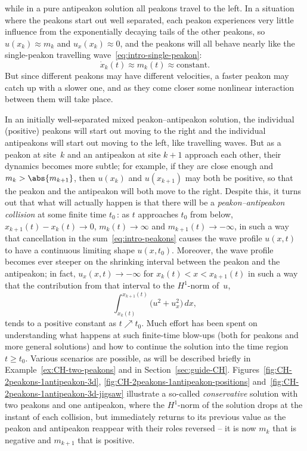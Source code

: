 \documentclass[10pt,a4paper]{article} \pdfoutput=1 
\begin{document}
while in a pure antipeakon solution all peakons travel to the left.
In a situation where the peakons start out well separated,
each peakon experiences very little influence
from the exponentially decaying tails of the other peakons,
so $u(x_k) \approx m_k$ and $u_x(x_k) \approx 0$,
and the peakons will all behave nearly like the single-peakon travelling wave~\eqref{eq:intro-single-peakon}:
\begin{equation*}
  \dot x_k(t) \approx m_k(t) \approx \text{constant}
  .
\end{equation*}
But since different peakons may have different velocities,
a faster peakon may catch up with a slower one,
and as they come closer some nonlinear interaction between them will take place.

In an initially well-separated mixed peakon--antipeakon solution,
the individual (positive) peakons will start out moving to the right
and the individual antipeakons will start out moving to the left,
like travelling waves.
But as a peakon at site~$k$ and an antipeakon at site $k+1$ approach each other,
their dynamics becomes more subtle;
for example, if they are close enough
and $m_k > \abs{m_{k+1}}$,
then $u(x_k)$ and $u(x_{k+1})$ may both be positive,
so that the peakon and the antipeakon will both move to the right.
Despite this, it turns out that what will actually happen is that there will be a
\emph{peakon--antipeakon collision}
at some finite time $t_0$\,:
as $t$ approaches $t_0$ from below,
$x_{k+1}(t) - x_k(t) \to 0$,
$m_k(t) \to \infty$ and $m_{k+1}(t) \to -\infty$,
in such a way that cancellation in the sum~\eqref{eq:intro-peakons} causes
the wave profile $u(x,t)$ to have a continuous limiting shape $u(x,t_0)$.
Moreover, the wave profile becomes ever steeper on the shrinking interval
between the peakon and the antipeakon;
in fact,
$u_x(x,t) \to -\infty$ for $x_k(t) < x < x_{k+1}(t)$
in such a way that the contribution from that interval to the $H^1$-norm of~$u$,
\begin{equation*}
  \int_{x_k(t)}^{x_{k+1}(t)} \bigl( u^2 + u_x^2 \bigr) \, dx
  ,
\end{equation*}
tends to a positive constant as $t \nearrow t_0$.
Much effort has been spent on understanding what happens at such finite-time
blow-ups (both for peakons and more general solutions)
and how to continue the solution into the time region $t \ge t_0$.
Various scenarios are possible, as will be described briefly in
Example~\ref{ex:CH-two-peakons} and in Section~\ref{sec:guide-CH}.
Figures~\ref{fig:CH-2peakons-1antipeakon-3d}, \ref{fig:CH-2peakons-1antipeakon-positions}
and~\ref{fig:CH-2peakons-1antipeakon-3d-jigsaw}
illustrate a so-called \emph{conservative} solution
with two peakons and one antipeakon,
where the $H^1$-norm of the solution drops at the instant of each collision,
but immediately returns to its previous value as the peakon and antipeakon reappear
with their roles reversed -- it is now $m_k$ that is negative and  $m_{k+1}$ that is positive.
\end{document}
